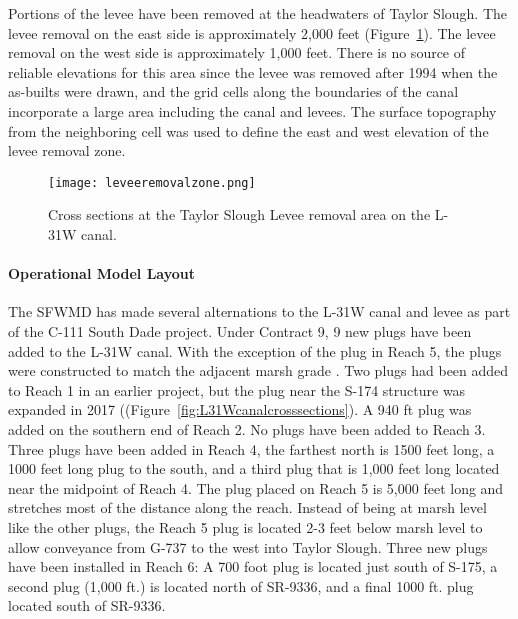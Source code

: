 Portions of the levee have been removed at the headwaters of Taylor Slough.  The levee removal on the east side is approximately 2,000 feet (Figure~\ref{fig:LeveeRemovalZone}).  The levee removal on the west side is approximately 1,000 feet.  There is no source of reliable elevations for this area since the levee was removed after 1994 when the as-builts were drawn, and the grid cells along the boundaries of the canal incorporate a large area including the canal and levees.  The surface topography from the neighboring cell was used to define the east and west elevation of the levee removal zone.

\begin{figure}[!h]
  \begin{center}
  \texttt{[image: leveeremovalzone.png]}
  \caption[Cross sections at the Taylor Slough Levee removal area on the L-31W canal.]{Cross sections at the Taylor Slough Levee removal area on the L-31W canal.}
  \label{fig:LeveeRemovalZone}
  \end{center}
\end{figure}

\paragraph{Operational Model Layout}

The SFWMD has made several alternations to the L-31W canal and levee as part of the C-111 South Dade project.  Under Contract 9, 9 new plugs have been added to the L-31W canal.  With the exception of the plug in Reach 5, the plugs were constructed to match the adjacent marsh grade \citep{USACE2016C111SD}.  Two plugs had been added to Reach 1 in an earlier project, but the plug near the S-174 structure was expanded in 2017 ((Figure~\ref{fig:L31Wcanalcrosssections}).  A 940 ft plug was added on the southern end of Reach 2.  No plugs have been added to Reach 3.  Three plugs have been added in Reach 4, the farthest north is 1500 feet long, a 1000 feet long plug to the south, and a third plug that is 1,000 feet long located near the midpoint of Reach 4.  The plug placed on Reach 5 is 5,000 feet long and stretches most of the distance along the reach.   Instead of being at marsh level like the other plugs, the Reach 5 plug is located 2-3 feet below marsh level to allow conveyance from G-737 to the west into Taylor Slough.  Three new plugs have been installed in Reach 6: A 700 foot plug is located just south of S-175, a second plug (1,000 ft.) is located north of SR-9336, and a final 1000 ft. plug located south of SR-9336.

